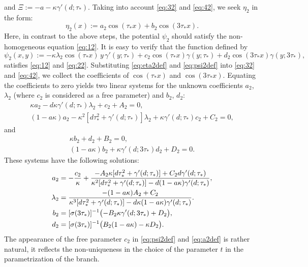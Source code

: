\documentclass[oneside,a4paper,11pt]{article}
\theoremstyle{thmstyletwo}%
\theoremstyle{thmstylethree}%
\numberwithin{equation}{section}
\def\gamm{\gamma}
\def\taust{\tau_{*}}
\def\Disp{\sigma}
\def\dUd{\kappa}
\def\mddU{a}
\begin{document}
and  $\Xi:={-\mddU} - \dUd\gamm'(d;\taust)$.
Taking into account \eqref{eq:32} and \eqref{eq:42}, we seek $\eta_2$ in the form:
\begin{equation}
\eta_2(x):=a_2 \cos(\taust x) + b_2 \cos(3\taust x).\label{eq:eta2def}
\end{equation}
Here, in contrast to the above steps, the potential $\psi_2$ should satisfy the non-homogeneous equation \eqref{eq:12}. It is easy to verify that the function defined by\vskip-3mm
\begin{equation}
\psi_2(x,y):=
-\dUd\lambda_2\cos(\taust x) \,y\, \gamm'(y;\taust)
+c_2 \cos(\taust x)\gamm(y;\taust)
+d_2 \cos(3\taust x)\gamm(y;3\taust),\label{eq:psi2def}
\end{equation}
satisfies \eqref{eq:12} and \eqref{eq:22}.
Substituting \eqref{eq:eta2def} and \eqref{eq:psi2def} into \eqref{eq:32} and  \eqref{eq:42}, we collect the coefficients of
 $\cos(\taust x)$ and $\cos(3\taust x)$. Equating the coefficients to zero yields two linear systems for the unknown coefficients $a_2$, $\lambda_2$ (where $c_2$ is considered as a free parameter) and $b_2$, $d_2$:
\begin{gather*}
\dUd a_2- d\dUd\gamm'(d;\taust)\lambda_2+c_2+A_2=0,\\
(1-\mddU\dUd)a_2 - \dUd^2[d \taust^2 +\gamm'(d;\taust)]\lambda_2+\dUd\gamm'(d;\taust)c_2+C_2=0,
\end{gather*}
and\vskip-7mm
\begin{gather*}
\dUd b_2 + d_2 + B_2=0,\\
(1-\mddU\dUd)b_2+\dUd\gamm'(d;3\taust)d_2+D_2=0.
\end{gather*}
These systems have the following solutions:
\begin{align}
a_2&=-\frac{c_2}{\dUd}+\frac{-A_2 \dUd[d\taust^2+\gamm'(d;\taust)]+C_2d\gamm'(d;\taust)}
{\dUd^2[d\taust^2+\gamm'(d;\taust)]-d(1-\mddU\dUd)\gamm'(d;\taust)},\label{eq:a2def}\\
\lambda_2&=\frac{-(1-\mddU\dUd)A_2+C_2}
{\dUd^3[d\taust^2+\gamm'(d;\taust)]-d\dUd(1-\mddU\dUd)\gamm'(d;\taust)}.
\label{eq:lambda2def}\\
b_2&
 =[\Disp(3\taust)]^{-1}\bigl(-B_2\dUd\gamm'(d;3\taust)+D_2\bigr),\notag\\
d_2&=
[\Disp(3\taust)]^{-1}\bigl(B_2(1-\mddU\dUd)-\dUd D_2\bigr).\notag
\end{align}
The appearance of the free parameter $c_2$ in \eqref{eq:psi2def} and \eqref{eq:a2def} is rather natural,
it reflects the non-uniqueness in the choice of the parameter $t$ in the parametrization of the branch.
\end{document}
